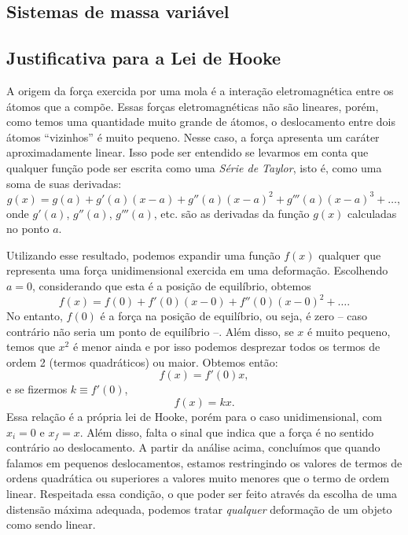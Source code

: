 \subsection{Sistemas de massa variável}
\subsection{Justificativa para a Lei de Hooke}

A origem da força exercida por uma mola é a interação eletromagnética entre os átomos que a compõe. Essas forças eletromagnéticas não são lineares, porém, como temos uma quantidade muito grande de átomos, o deslocamento entre dois átomos ``vizinhos'' é muito pequeno. Nesse caso, a força apresenta um caráter aproximadamente linear. Isso pode ser entendido se levarmos em conta que qualquer função pode ser escrita como uma \emph{Série de Taylor}, isto é, como uma soma de suas derivadas:
\begin{equation}
	g(x) = g(a) + g'(a)(x - a) + g''(a)(x-a)^2 + g'''(a)(x-a)^3 + \dots,
\end{equation}
onde $g'(a)$, $g''(a)$, $g'''(a)$, etc. são as derivadas da função $g(x)$ calculadas no ponto $a$.

Utilizando esse resultado, podemos expandir uma função $f(x)$ qualquer que representa uma força unidimensional exercida em uma deformação. Escolhendo $a=0$, considerando que esta é a posição de equilíbrio, obtemos
\begin{equation}
	f(x) = f(0) + f'(0) (x-0) + f''(0)(x-0)^2 + \dots.
\end{equation}
%
No entanto, $f(0)$ é a força na posição de equilíbrio, ou seja, é zero -- caso contrário não seria um ponto de equilíbrio --. Além disso, se $x$ é muito pequeno, temos que $x^2$ é menor ainda e por isso podemos desprezar todos os termos de ordem 2 (termos quadráticos) ou maior. Obtemos então:
\begin{equation}
	f(x) = f'(0)x,
\end{equation}
%
e se fizermos $k \equiv f'(0)$,
\begin{equation}
	f(x) = kx.
\end{equation}
%
Essa relação é a própria lei de Hooke, porém para o caso unidimensional, com $x_i = 0$ e $x_f = x$. Além disso, falta o sinal que indica que a força é no sentido contrário ao deslocamento. A partir da análise acima, concluímos que quando falamos em pequenos deslocamentos, estamos restringindo os valores de termos de ordens quadrática ou superiores a valores muito menores que o termo de ordem linear. Respeitada essa condição, o que poder ser feito através da escolha de uma distensão máxima adequada, podemos tratar \emph{qualquer} deformação de um objeto como sendo linear.

